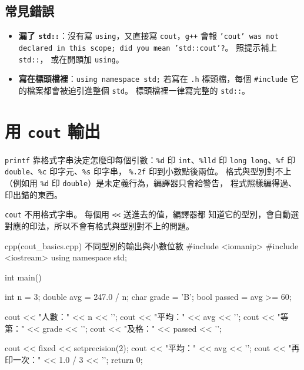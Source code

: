 \subsection{常見錯誤}

\begin{itemize}
\item \textbf{漏了 \texttt{std::}}：沒有寫 \texttt{using}，又直接寫
\texttt{cout}，\texttt{g++} 會報 \texttt{'cout' was not declared in
this scope; did you mean 'std::cout'?}。 照提示補上 \texttt{std::}，
或在開頭加 \texttt{using}。
\item \textbf{寫在標頭檔裡}：\texttt{using namespace std;} 若寫在
\texttt{.h} 標頭檔，每個 \texttt{\#include} 它的檔案都會被迫引進整個
\texttt{std}。 標頭檔裡一律寫完整的 \texttt{std::}。
\end{itemize}

\section{用 \texttt{cout} 輸出}
\label{sec:cout}

\begin{crecap}
\texttt{printf} 靠格式字串決定怎麼印每個引數：\texttt{\%d} 印
\texttt{int}、\texttt{\%lld} 印 \texttt{long long}、\texttt{\%f} 印
\texttt{double}、\texttt{\%c} 印字元、\texttt{\%s} 印字串，
\texttt{\%.2f} 印到小數點後兩位。 格式與型別對不上（例如用
\texttt{\%d} 印 \texttt{double}）是未定義行為，編譯器只會給警告，
程式照樣編得過、印出錯的東西。
\end{crecap}

\texttt{cout} 不用格式字串。 每個用 \texttt{<<} 送進去的值，編譯器都
知道它的型別，會自動選對應的印法，所以不會有格式與型別對不上的問題。

\begin{example}[label=ex:cout-basics]{cpp}{(cout\_basics.cpp) 不同型別的輸出與小數位數}
#include <iomanip>
#include <iostream>
using namespace std;

int main() {
    int n = 3;
    double avg = 247.0 / n;
    char grade = 'B';
    bool passed = avg >= 60;

    cout << "人數：" << n << '\n';
    cout << "平均：" << avg << '\n';
    cout << "等第：" << grade << '\n';
    cout << "及格：" << passed << '\n';

    cout << fixed << setprecision(2);
    cout << "平均：" << avg << '\n';
    cout << "再印一次：" << 1.0 / 3 << '\n';
    return 0;
}
\end{example}

